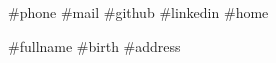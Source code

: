 \boxinfo
{#{phone}}
{#{mail}}
{#{github}}
{#{linkedin}}
{#{home}}

\header
{#{fullname}}
{#{birth}}
{#{address}}

\begin{abstract}
  \begin{multicols}{2}
    #{summary[0] | render}
    \columnbreak
    #{summary[1] | render}
  \end{multicols}
\end{abstract}
